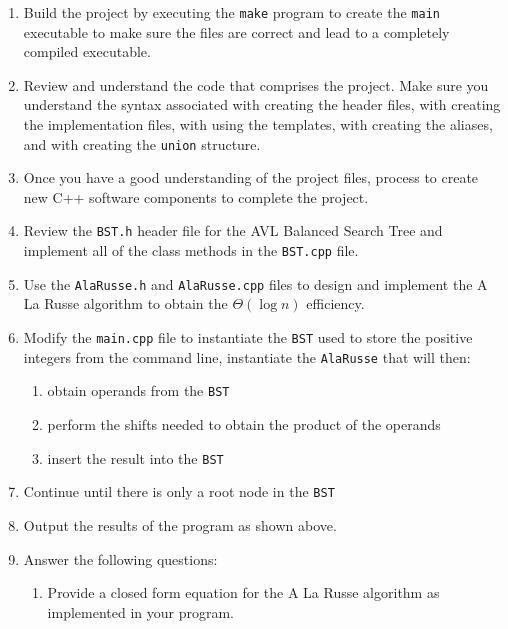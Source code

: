 \documentclass[10pt]{article}
\begin{document}
\begin{enumerate}
	\item Build the project by executing the \verb|make| program to create the \verb|main| executable to make sure the files are correct and lead to a completely compiled executable.
   
   \item Review and understand the code that comprises the project. Make sure you understand the syntax associated with creating the header files, with creating the implementation files, with using the templates, with creating the aliases, and with creating the \verb|union| structure. 
   
   \item Once you have a good understanding of the project files, process to create new C++ software components to complete the project. 
   
   \item Review the \verb|BST.h| header file for the AVL Balanced Search Tree and implement all of the class methods in the \verb|BST.cpp| file. 
   
   \item Use the \verb|AlaRusse.h| and \verb|AlaRusse.cpp| files to design and implement the A La Russe algorithm to obtain the $\Theta(\log n)$ efficiency. 
   
   \item Modify the \verb|main.cpp| file to instantiate the \verb|BST| used to store the positive integers from the command line, instantiate the \verb|AlaRusse| that will then:
   \begin{enumerate}
      \item obtain operands from the \verb|BST|
      \item perform the shifts needed to obtain the product of the operands
      \item insert the result into the \verb|BST|
   \end{enumerate}

   \item Continue until there is only a root node in the \verb|BST|
   
   \item Output the results of the program as shown above.
   
   \item Answer the following questions:
   \begin{enumerate}
      \item Provide a closed form equation for the A La Russe algorithm as implemented in your program.
      

\end{enumerate}
\end{enumerate}
\end{document}

